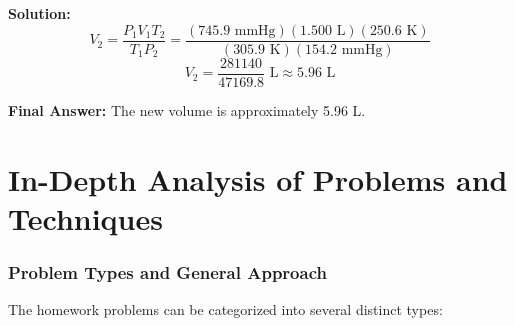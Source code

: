 \documentclass{article}
\begin{document}
\textbf{Solution:}
\[ V_2 = \frac{P_1V_1T_2}{T_1P_2} = \frac{(745.9 \text{ mmHg})(1.500 \text{ L})(250.6 \text{ K})}{(305.9 \text{ K})(154.2 \text{ mmHg})} \]
\[ V_2 = \frac{281140}{47169.8} \text{ L} \approx 5.96 \text{ L} \]

\textbf{Final Answer:} The new volume is approximately 5.96 L.

\part{In-Depth Analysis of Problems and Techniques}

\section{Problem Types and General Approach}
The homework problems can be categorized into several distinct types:
\end{document}

